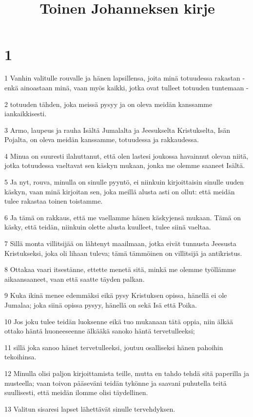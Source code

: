 

\title{Toinen Johanneksen kirje}


\chapter{1}

\par 1 Vanhin valitulle rouvalle ja hänen lapsillensa, joita minä totuudessa rakastan - enkä ainoastaan minä, vaan myös kaikki, jotka ovat tulleet totuuden tuntemaan -
\par 2 totuuden tähden, joka meissä pysyy ja on oleva meidän kanssamme iankaikkisesti.
\par 3 Armo, laupeus ja rauha Isältä Jumalalta ja Jeesukselta Kristukselta, Isän Pojalta, on oleva meidän kanssamme, totuudessa ja rakkaudessa.
\par 4 Minua on suuresti ilahuttanut, että olen lastesi joukossa havainnut olevan niitä, jotka totuudessa vaeltavat sen käskyn mukaan, jonka me olemme saaneet Isältä.
\par 5 Ja nyt, rouva, minulla on sinulle pyyntö, ei niinkuin kirjoittaisin sinulle uuden käskyn, vaan minä kirjoitan sen, joka meillä alusta asti on ollut: että meidän tulee rakastaa toinen toistamme.
\par 6 Ja tämä on rakkaus, että me vaellamme hänen käskyjensä mukaan. Tämä on käsky, että teidän, niinkuin olette alusta kuulleet, tulee siinä vaeltaa.
\par 7 Sillä monta villitsijää on lähtenyt maailmaan, jotka eivät tunnusta Jeesusta Kristukseksi, joka oli lihaan tuleva; tämä tämmöinen on villitsijä ja antikristus.
\par 8 Ottakaa vaari itsestänne, ettette menetä sitä, minkä me olemme työllämme aikaansaaneet, vaan että saatte täyden palkan.
\par 9 Kuka ikinä menee edemmäksi eikä pysy Kristuksen opissa, hänellä ei ole Jumalaa; joka siinä opissa pysyy, hänellä on sekä Isä että Poika.
\par 10 Jos joku tulee teidän luoksenne eikä tuo mukanaan tätä oppia, niin älkää ottako häntä huoneeseenne älkääkä sanoko häntä tervetulleeksi;
\par 11 sillä joka sanoo hänet tervetulleeksi, joutuu osalliseksi hänen pahoihin tekoihinsa.
\par 12 Minulla olisi paljon kirjoittamista teille, mutta en tahdo tehdä sitä paperilla ja musteella; vaan toivon pääseväni teidän tykönne ja saavani puhutella teitä suullisesti, että meidän ilomme olisi täydellinen.
\par 13 Valitun sisaresi lapset lähettävät sinulle tervehdyksen.


